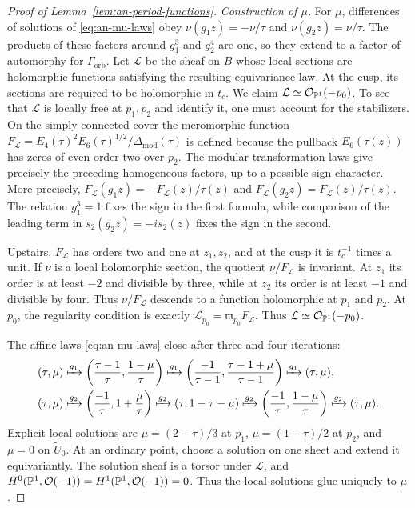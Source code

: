 \begin{proof}[Proof of Lemma~\ref{lem:an-period-functions}]
\smallskip
\noindent\emph{Construction of $\mu$.}
For $\mu$, differences of solutions
of \eqref{eq:an-mu-laws} obey $\nu(g_1z)=-\nu/\tau$ and
$\nu(g_2z)=\nu/\tau$.
The products of these factors around $g_1^3$ and $g_2^4$ are one, so
they extend to a factor of automorphy for $\Gamma_{\mathrm{orb}}$.  Let
$\mathcal L$ be the sheaf on $B$ whose local sections are holomorphic
functions satisfying the resulting equivariance law.  At the cusp, its
sections are required to be holomorphic in $t_c$.  We claim
$\mathcal L\simeq\mathcal O_{\mathbb P^1}(-p_0)$.
To see that $\mathcal L$ is locally free at $p_1,p_2$ and identify it,
one must account for the stabilizers.  On the simply connected cover the
meromorphic function
$F_{\mathcal L}=E_4(\tau)^2E_6(\tau)^{1/2}/
\Delta_{\mathrm{mod}}(\tau)$
is defined because the pullback $E_6(\tau(z))$ has zeros of even order
two over $p_2$.  The modular transformation laws give precisely the
preceding homogeneous factors, up to a possible sign character.  More
precisely, $F_{\mathcal L}(g_1z)=-F_{\mathcal L}(z)/\tau(z)$ and
$F_{\mathcal L}(g_2z)=F_{\mathcal L}(z)/\tau(z)$.
The relation $g_1^3=1$ fixes the sign in the first formula, while comparison
of the leading term in $s_2(g_2z)=-is_2(z)$ fixes the sign in the second.

Upstairs, $F_{\mathcal L}$ has orders two and one at $z_1,z_2$, and
at the cusp it is $t_c^{-1}$ times a unit.  If $\nu$ is a local
holomorphic section, the quotient $\nu/F_{\mathcal L}$ is invariant.  At
$z_1$ its order is at least $-2$ and divisible by three, while at
$z_2$ its order is at least $-1$ and divisible by four.  Thus
$\nu/F_{\mathcal L}$ descends to a function holomorphic at $p_1$ and
$p_2$.  At $p_0$, the
regularity condition is exactly
$\mathcal L_{p_0}=\mathfrak m_{p_0}F_{\mathcal L}$.  Thus
$\mathcal L\simeq\mathcal O_{\mathbb P^1}(-p_0)$.

The affine laws \eqref{eq:an-mu-laws} close after three and four
iterations:
\[
\begin{aligned}
(\tau,\mu)&\xmapsto{g_1}
 \left(\frac{\tau-1}{\tau},\frac{1-\mu}{\tau}\right)
 \xmapsto{g_1}
 \left(\frac{-1}{\tau-1},\frac{\tau-1+\mu}{\tau-1}\right)
 \xmapsto{g_1}(\tau,\mu),\\
(\tau,\mu)&\xmapsto{g_2}
 \left(\frac{-1}{\tau},1+\frac\mu\tau\right)
 \xmapsto{g_2}(\tau,1-\tau-\mu)
 \xmapsto{g_2}
 \left(\frac{-1}{\tau},\frac{1-\mu}{\tau}\right)
 \xmapsto{g_2}(\tau,\mu).
\end{aligned}
\]
Explicit local solutions are $\mu=(2-\tau)/3$ at $p_1$,
$\mu=(1-\tau)/2$ at $p_2$, and $\mu=0$ on $\widetilde U_0$.
At an ordinary point, choose a solution on one sheet and extend it
equivariantly.  The solution sheaf is a torsor under $\mathcal L$, and
$H^0(\mathbb P^1,\mathcal O(-1))=H^1(\mathbb P^1,\mathcal O(-1))=0$.
Thus the local solutions glue uniquely to $\mu$.


\end{proof}

